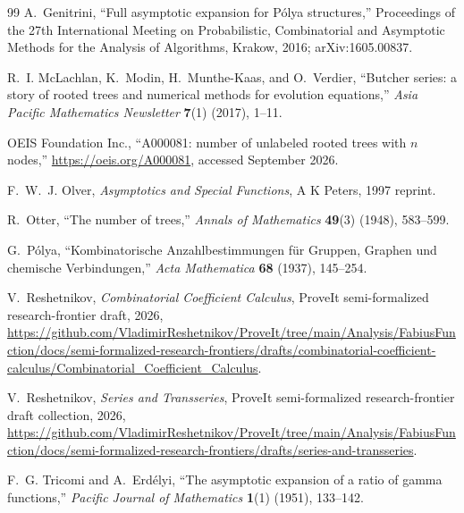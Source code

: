 \documentclass[11pt,a4paper,oneside,openany]{book}
\theoremstyle{definition}
\theoremstyle{remark}
\begin{document}
\begin{thebibliography}{99}
A.~Genitrini,
``Full asymptotic expansion for P\'olya structures,''
Proceedings of the 27th International Meeting on Probabilistic,
Combinatorial and Asymptotic Methods for the Analysis of Algorithms,
Krakow, 2016; arXiv:1605.00837.

R.~I. McLachlan, K.~Modin, H.~Munthe-Kaas, and O.~Verdier,
``Butcher series: a story of rooted trees and numerical methods for evolution
equations,'' \emph{Asia Pacific Mathematics Newsletter} \textbf{7}(1) (2017),
1--11.

OEIS Foundation Inc.,
``A000081: number of unlabeled rooted trees with $n$ nodes,''
\url{https://oeis.org/A000081}, accessed September 2026.

F.~W.~J. Olver,
\emph{Asymptotics and Special Functions}, A K Peters, 1997 reprint.

R.~Otter,
``The number of trees,''
\emph{Annals of Mathematics} \textbf{49}(3) (1948), 583--599.

G.~P\'olya,
``Kombinatorische Anzahlbestimmungen f\"ur Gruppen, Graphen und chemische
Verbindungen,'' \emph{Acta Mathematica} \textbf{68} (1937), 145--254.

V.~Reshetnikov,
\emph{Combinatorial Coefficient Calculus},
ProveIt semi-formalized research-frontier draft, 2026,
\url{https://github.com/VladimirReshetnikov/ProveIt/tree/main/Analysis/FabiusFunction/docs/semi-formalized-research-frontiers/drafts/combinatorial-coefficient-calculus/Combinatorial_Coefficient_Calculus}.

V.~Reshetnikov,
\emph{Series and Transseries},
ProveIt semi-formalized research-frontier draft collection, 2026,
\url{https://github.com/VladimirReshetnikov/ProveIt/tree/main/Analysis/FabiusFunction/docs/semi-formalized-research-frontiers/drafts/series-and-transseries}.

F.~G. Tricomi and A.~Erd\'elyi,
``The asymptotic expansion of a ratio of gamma functions,''
\emph{Pacific Journal of Mathematics} \textbf{1}(1) (1951), 133--142.

\end{thebibliography}
\end{document}
